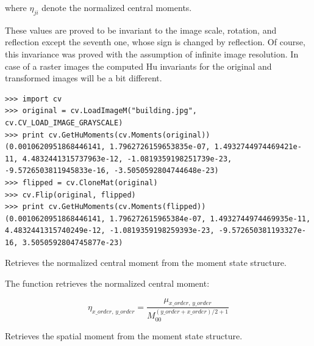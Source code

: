 where $\eta_{ji}$ denote the normalized central moments.

These values are proved to be invariant to the image scale, rotation, and reflection except the seventh one, whose sign is changed by reflection. Of course, this invariance was proved with the assumption of infinite image resolution. In case of a raster images the computed Hu invariants for the original and transformed images will be a bit different.

\ifPy
\begin{lstlisting}
>>> import cv
>>> original = cv.LoadImageM("building.jpg", cv.CV_LOAD_IMAGE_GRAYSCALE)
>>> print cv.GetHuMoments(cv.Moments(original))
(0.0010620951868446141, 1.7962726159653835e-07, 1.4932744974469421e-11, 4.4832441315737963e-12, -1.0819359198251739e-23, -9.5726503811945833e-16, -3.5050592804744648e-23)
>>> flipped = cv.CloneMat(original)
>>> cv.Flip(original, flipped)
>>> print cv.GetHuMoments(cv.Moments(flipped))
(0.0010620951868446141, 1.796272615965384e-07, 1.4932744974469935e-11, 4.4832441315740249e-12, -1.0819359198259393e-23, -9.572650381193327e-16, 3.5050592804745877e-23)
\end{lstlisting}
\fi

Retrieves the normalized central moment from the moment state structure.


\begin{description}
\end{description}

The function retrieves the normalized central moment:

\[
\eta_{x\_order, \, y\_order} = \frac{\mu_{x\_order, \, y\_order}}{M_{00}^{(y\_order+x\_order)/2+1}}
\]

Retrieves the spatial moment from the moment state structure.



